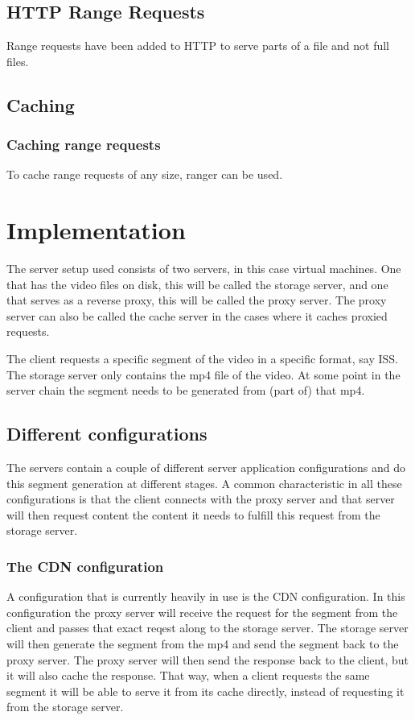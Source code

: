\documentclass[twoside,openright]{uva-bachelor-thesis}
\begin{document}
\section{HTTP Range Requests}
Range requests have been added to HTTP to serve parts of a file and not full
files.~\autocite{rangerequests}
\section{Caching}
\subsection{Caching range requests}
To cache range requests of any size, ranger \autocite{ranger} can be used.



\chapter{Implementation}
The server setup used consists of two servers, in this case virtual machines.
One that has the video files on disk, this will be called the storage server,
and one that serves as a reverse proxy, this will be called the proxy server.
The proxy server can also be called the cache server in the cases where it
caches proxied requests.

The client requests a specific segment of the video in a specific format, say
ISS. The storage server only contains the mp4 file of the video. At some point
in the server chain the segment needs to be generated from (part of) that mp4.

\section{Different configurations}
The servers contain a couple of different server application configurations and
do this segment generation at different stages. A common characteristic in all
these configurations is that the client connects with the proxy server and that
server will then request content the content it needs to fulfill this request
from the storage server.


\subsection{The CDN configuration}
A configuration that is currently heavily in use is the CDN configuration. In
this configuration the proxy server will receive the request for the segment
from the client and passes that exact reqest along to the storage server. The
storage server will then generate the segment from the mp4 and send the segment
back to the proxy server.  The proxy server will then send the response back to
the client, but it will also cache the response. That way, when a client
requests the same segment it will be able to serve it from its cache directly,
instead of requesting it from the storage server.
\end{document}
